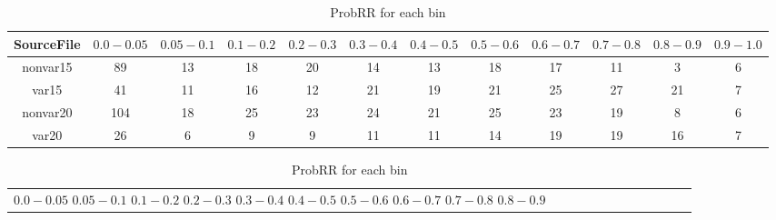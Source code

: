 \documentclass[aps,prb,twocolumn,superscriptaddress]{revtex4-1}
\begin{document}
\begin{table*}
	\begin{center}
		\begin{tabular}{| c | c | c | c | c | c | c | c | c | c | c | c |}\hline
			SourceFile & $0.0-0.05$ & $0.05-0.1$ & $0.1-0.2$ & $0.2-0.3$ & $0.3-0.4$ & $0.4-0.5$ & $0.5-0.6$ & $0.6-0.7$ & $0.7-0.8$ & $0.8-0.9$ & $0.9-1.0$ \\ \hline
			nonvar15 & 89 & 13 & 18 & 20 & 14 & 13 & 18 & 17 & 11 & 3 & 6 \\ \hline
			var15 & 41 & 11 & 16 & 12 & 21 & 19 & 21 & 25 & 27 & 21 & 7 \\ \hline
			nonvar20 & 104 & 18 & 25 & 23 & 24 & 21 & 25 & 23 & 19 & 8 & 6 \\ \hline
			var20 & 26 & 6 & 9 & 9 & 11 & 11 & 14 & 19 & 19 & 16 & 7 \\ \hline
		\end{tabular}
	\end{center}
\caption{ \small{ProbRR for each bin\label{tab:probbRRbin}}}
\end{table*}





\begin{table}[H]
	\begin{center}
		\begin{tabular}{| c | c | c | c | c | c | c | c | c | c | c | c |}\hline
			$0.0-0.05$ 
			$0.05-0.1$ 
			$0.1-0.2$ 
			$0.2-0.3$ 
			$0.3-0.4$ 
			$0.4-0.5$ 
			$0.5-0.6$ 
			$0.6-0.7$ 
			$0.7-0.8$ 
			$0.8-0.9$
		\end{tabular}
	\end{center}
\caption{ \small{ProbRR for each bin\label{tab:probbRRbin}}}
\end{table}
\end{document}
